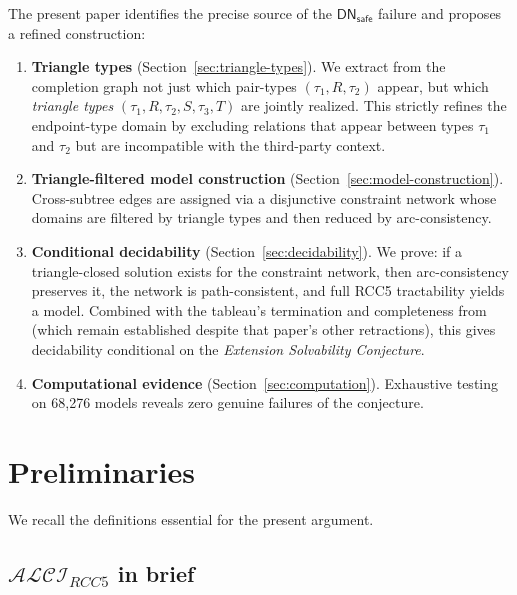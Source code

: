 \documentclass[a4paper,11pt]{article}
\theoremstyle{definition}
\newcommand{\ALCIRCC}[1]{\ensuremath{\mathcal{ALCI}_{\mathit{RCC#1}}}}
\newcommand{\DN}{\ensuremath{\mathsf{DN}}}
\begin{document}
The present paper identifies the precise source of the
$\DN_{\mathsf{safe}}$ failure and proposes a refined construction:
\begin{enumerate}[nosep]
  \item \textbf{Triangle types} (Section~\ref{sec:triangle-types}).
    We extract from the completion graph not just which pair-types
    $(\tau_1, R, \tau_2)$ appear, but which \emph{triangle types}
    $(\tau_1, R, \tau_2, S, \tau_3, T)$ are jointly realized.  This
    strictly refines the endpoint-type domain by excluding relations
    that appear between types $\tau_1$ and $\tau_2$ but are
    incompatible with the third-party context.

  \item \textbf{Triangle-filtered model construction}
    (Section~\ref{sec:model-construction}).  Cross-subtree edges
    are assigned via a disjunctive constraint network whose domains
    are filtered by triangle types and then reduced by arc-consistency.

  \item \textbf{Conditional decidability}
    (Section~\ref{sec:decidability}).  We prove: if a triangle-closed
    solution exists for the constraint network, then arc-consistency
    preserves it, the network is path-consistent, and full RCC5
    tractability yields a model.  Combined with the tableau's
    termination and completeness from~\cite{CompanionPaper} (which
    remain established despite that paper's other retractions),
    this gives decidability conditional on the \emph{Extension
    Solvability Conjecture}.

  \item \textbf{Computational evidence}
    (Section~\ref{sec:computation}).  Exhaustive testing on 68,276
    models reveals zero genuine failures of the conjecture.
\end{enumerate}


\section{Preliminaries}
\label{sec:prelim}

We recall the definitions essential for the present argument.

\subsection{$\ALCIRCC{5}$ in brief}
\end{document}
